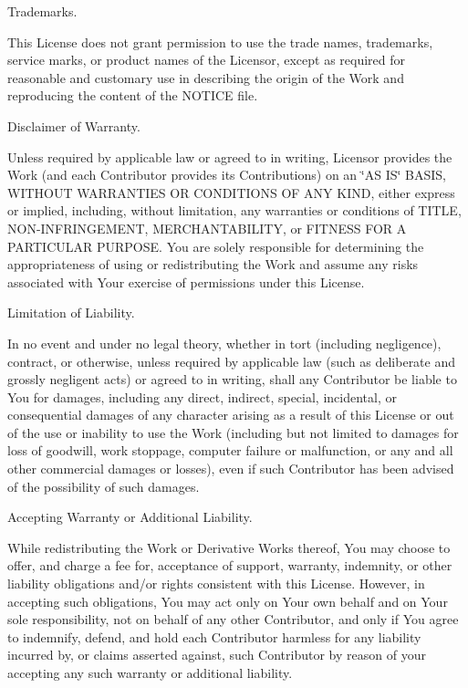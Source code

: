 \begin{DoxyEnumerate}
\item Trademarks.
\end{DoxyEnumerate}

This License does not grant permission to use the trade names, trademarks, service marks, or product names of the Licensor, except as required for reasonable and customary use in describing the origin of the Work and reproducing the content of the NOTICE file.


\begin{DoxyEnumerate}
\item Disclaimer of Warranty.
\end{DoxyEnumerate}

Unless required by applicable law or agreed to in writing, Licensor provides the Work (and each Contributor provides its Contributions) on an \char`\"{}\+AS IS\char`\"{} BASIS, WITHOUT WARRANTIES OR CONDITIONS OF ANY KIND, either express or implied, including, without limitation, any warranties or conditions of TITLE, NON-\/\+INFRINGEMENT, MERCHANTABILITY, or FITNESS FOR A PARTICULAR PURPOSE. You are solely responsible for determining the appropriateness of using or redistributing the Work and assume any risks associated with Your exercise of permissions under this License.


\begin{DoxyEnumerate}
\item Limitation of Liability.
\end{DoxyEnumerate}

In no event and under no legal theory, whether in tort (including negligence), contract, or otherwise, unless required by applicable law (such as deliberate and grossly negligent acts) or agreed to in writing, shall any Contributor be liable to You for damages, including any direct, indirect, special, incidental, or consequential damages of any character arising as a result of this License or out of the use or inability to use the Work (including but not limited to damages for loss of goodwill, work stoppage, computer failure or malfunction, or any and all other commercial damages or losses), even if such Contributor has been advised of the possibility of such damages.


\begin{DoxyEnumerate}
\item Accepting Warranty or Additional Liability.
\end{DoxyEnumerate}

While redistributing the Work or Derivative Works thereof, You may choose to offer, and charge a fee for, acceptance of support, warranty, indemnity, or other liability obligations and/or rights consistent with this License. However, in accepting such obligations, You may act only on Your own behalf and on Your sole responsibility, not on behalf of any other Contributor, and only if You agree to indemnify, defend, and hold each Contributor harmless for any liability incurred by, or claims asserted against, such Contributor by reason of your accepting any such warranty or additional liability.

